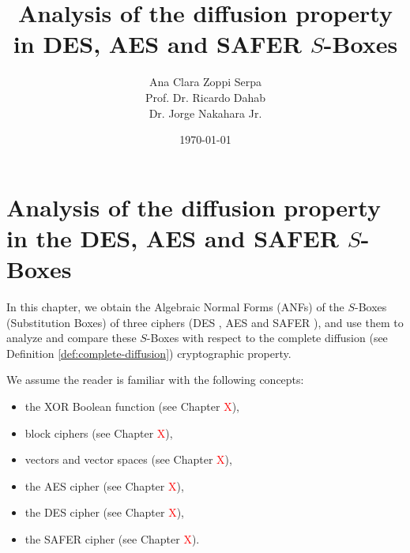 \documentclass{report}
\title{Analysis of the diffusion property in DES, AES and SAFER $S$-Boxes}
\author{Ana Clara Zoppi Serpa\\ Prof. Dr. Ricardo Dahab \\ Dr. Jorge Nakahara Jr.}
\date{\today}
\begin{document}
\maketitle

\chapter{Analysis of the diffusion property in the DES, AES and SAFER $S$-Boxes}
In this chapter, we obtain the Algebraic Normal Forms (ANFs) of the $S$-Boxes (Substitution Boxes) of three ciphers (DES \cite{DES-FIPS}, AES \cite{AES-FIPS} and SAFER \cite{SAFER-1993}), and use them to analyze and compare these $S$-Boxes with respect to the complete diffusion (see Definition \ref{def:complete-diffusion}) cryptographic property.

We assume the reader is familiar with the following concepts:
\begin{itemize}
    \item the XOR Boolean function (see Chapter \textcolor{red}{X}),
    \item block ciphers (see Chapter \textcolor{red}{X}),
    \item vectors and vector spaces (see Chapter \textcolor{red}{X}),
    \item the AES cipher (see Chapter \textcolor{red}{X}),
    \item the DES cipher (see Chapter \textcolor{red}{X}),
    \item the SAFER cipher (see Chapter \textcolor{red}{X}).
\end{itemize}
\end{document}
